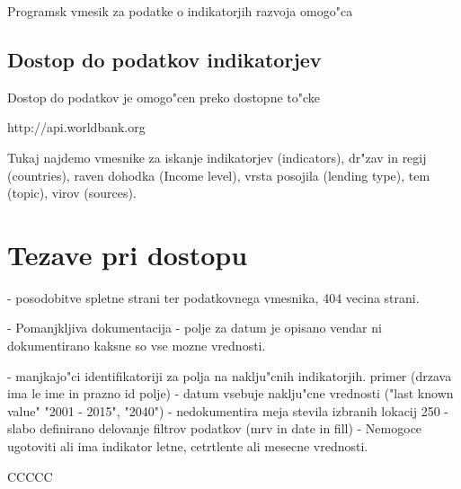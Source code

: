 Programsk vmesik za podatke o indikatorjih razvoja omogo"ca 


\subsection{Dostop do podatkov indikatorjev}

Dostop do podatkov je omogo"cen preko dostopne to"cke

http://api.worldbank.org

Tukaj najdemo vmesnike za iskanje indikatorjev (indicators), dr"zav in regij
(countries), raven dohodka (Income level), vrsta posojila (lending type), tem
(topic), virov (sources).





\section{Tezave pri dostopu}

- posodobitve spletne strani ter podatkovnega vmesnika, 404 vecina strani.

- Pomanjkljiva dokumentacija
    - polje za datum je opisano vendar ni dokumentirano kaksne so vse mozne
      vrednosti. 

- manjkajo"ci identifikatoriji za polja na naklju"cnih indikatorjih.
  primer (drzava ima le ime in prazno id polje)
- datum vsebuje naklju"cne vrednosti ("last known value" "2001 - 2015", "2040")
- nedokumentira meja stevila izbranih lokacij 250
- slabo definirano delovanje filtrov podatkov (mrv in date in fill)
- Nemogoce ugotoviti ali ima indikator letne, cetrtlente ali mesecne vrednosti.



CCCCC
